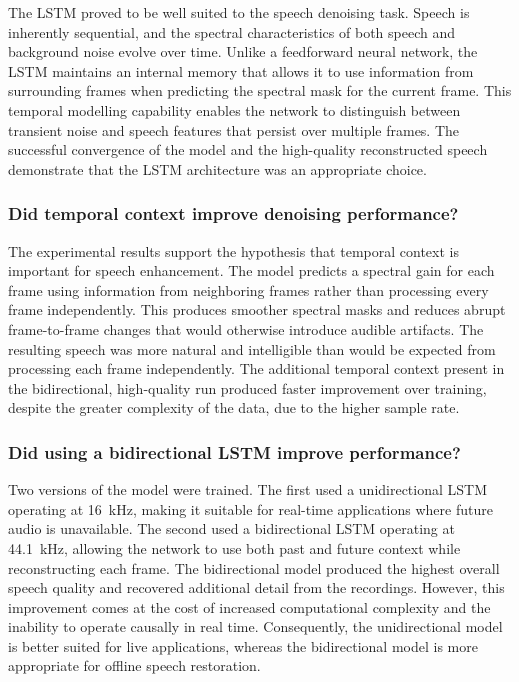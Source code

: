 \documentclass[11pt, letterpaper,titlepage]{article}
\begin{document}
The LSTM proved to be well suited to the speech denoising task. Speech is inherently sequential, and the spectral characteristics of both speech and background noise evolve over time. Unlike a feedforward neural network, the LSTM maintains an internal memory that allows it to use information from surrounding frames when predicting the spectral mask for the current frame. This temporal modelling capability enables the network to distinguish between transient noise and speech features that persist over multiple frames. The successful convergence of the model and the high-quality reconstructed speech demonstrate that the LSTM architecture was an appropriate choice.

\subsubsection*{Did temporal context improve denoising performance?}

The experimental results support the hypothesis that temporal context is important for speech enhancement. The model predicts a spectral gain for each frame using information from neighboring frames rather than processing every frame independently. This produces smoother spectral masks and reduces abrupt frame-to-frame changes that would otherwise introduce audible artifacts. The resulting speech was more natural and intelligible than would be expected from processing each frame independently. The additional temporal context present in the bidirectional, high-quality run produced faster improvement over training, despite the greater complexity of the data, due to the higher sample rate.

\subsubsection*{Did using a bidirectional LSTM improve performance?}

Two versions of the model were trained. The first used a unidirectional LSTM operating at 16~kHz, making it suitable for real-time applications where future audio is unavailable. The second used a bidirectional LSTM operating at 44.1~kHz, allowing the network to use both past and future context while reconstructing each frame. The bidirectional model produced the highest overall speech quality and recovered additional detail from the recordings. However, this improvement comes at the cost of increased computational complexity and the inability to operate causally in real time. Consequently, the unidirectional model is better suited for live applications, whereas the bidirectional model is more appropriate for offline speech restoration.
\end{document}
